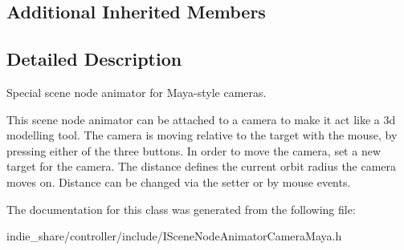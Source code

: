 \subsection*{Additional Inherited Members}


\subsection{Detailed Description}
Special scene node animator for Maya-\/style cameras. 

This scene node animator can be attached to a camera to make it act like a 3d modelling tool. The camera is moving relative to the target with the mouse, by pressing either of the three buttons. In order to move the camera, set a new target for the camera. The distance defines the current orbit radius the camera moves on. Distance can be changed via the setter or by mouse events. 

The documentation for this class was generated from the following file\+:\begin{DoxyCompactItemize}
\item 
indie\+\_\+share/controller/include/I\+Scene\+Node\+Animator\+Camera\+Maya.\+h\end{DoxyCompactItemize}
